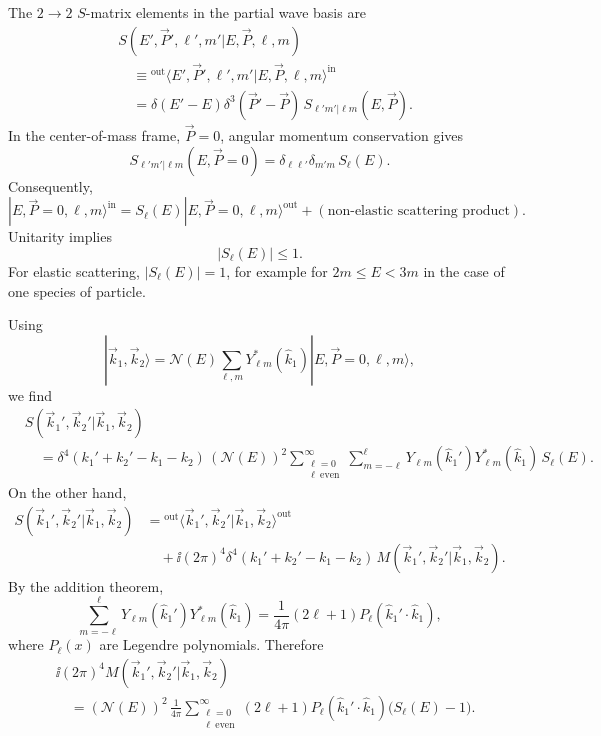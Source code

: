 The \(2\to2\) \(S\)-matrix elements in the partial wave basis are
\[
\begin{aligned}
&S(E',\vec P',\ell',m'|E,\vec P,\ell,m)
\\
&\quad \equiv
{}^{\mathrm{out}}\langle
E',\vec P',\ell',m'|E,\vec P,\ell,m
\rangle^{\mathrm{in}}
\\
&\quad =
\delta(E'-E)\delta^3(\vec P'-\vec P)\,
S_{\ell'm'|\ell m}(E,\vec P).
\end{aligned}
\]
In the center-of-mass frame, \(\vec P=0\), angular momentum conservation gives
\[
  S_{\ell'm'|\ell m}(E,\vec P=0)
  =
  \delta_{\ell\ell'}\delta_{m'm}\,S_\ell(E).
\]
Consequently,
\[
  |E,\vec P=0,\ell,m\rangle^{\mathrm{in}}
  =
  S_\ell(E)|E,\vec P=0,\ell,m\rangle^{\mathrm{out}}
  +(\text{non-elastic scattering product}).
\]
Unitarity implies
\[
  |S_\ell(E)|\le 1.
\]
For elastic scattering, \(|S_\ell(E)|=1\), for example for
\(2m\le E<3m\) in the case of one species of particle.

Using
\[
  |\vec k_1,\vec k_2\rangle
  =
  \mathcal N(E)
  \sum_{\ell,m}Y_{\ell m}^*(\hat k_1)
  |E,\vec P=0,\ell,m\rangle,
\]
we find
\[
\begin{aligned}
&S(\vec k_1',\vec k_2'|\vec k_1,\vec k_2)
\\
&\quad =
\delta^4(k_1'+k_2'-k_1-k_2)\,
(\mathcal N(E))^2
\sum_{\substack{\ell=0\\ \ell\ \mathrm{even}}}^{\infty}
\sum_{m=-\ell}^{\ell}
Y_{\ell m}(\hat k_1')Y_{\ell m}^*(\hat k_1)\,S_\ell(E).
\end{aligned}
\]
On the other hand,
\[
\begin{aligned}
S(\vec k_1',\vec k_2'|\vec k_1,\vec k_2)
&=
{}^{\mathrm{out}}\langle\vec k_1',\vec k_2'
|\vec k_1,\vec k_2\rangle^{\mathrm{out}}
\\
&\quad
+\ii(2\pi)^4\delta^4(k_1'+k_2'-k_1-k_2)\,
M(\vec k_1',\vec k_2'|\vec k_1,\vec k_2).
\end{aligned}
\]
By the addition theorem,
\[
  \sum_{m=-\ell}^{\ell}
  Y_{\ell m}(\hat k_1')Y_{\ell m}^*(\hat k_1)
  =
  \frac{1}{4\pi}(2\ell+1)P_\ell(\hat k_1'\cdot\hat k_1),
\]
where \(P_\ell(x)\) are Legendre polynomials. Therefore
\[
\begin{aligned}
&\ii(2\pi)^4M(\vec k_1',\vec k_2'|\vec k_1,\vec k_2)
\\
&\quad =
(\mathcal N(E))^2\,
\frac{1}{4\pi}
\sum_{\substack{\ell=0\\ \ell\ \mathrm{even}}}^{\infty}
(2\ell+1)P_\ell(\hat k_1'\cdot\hat k_1)\bigl(S_\ell(E)-1\bigr).
\end{aligned}
\]

